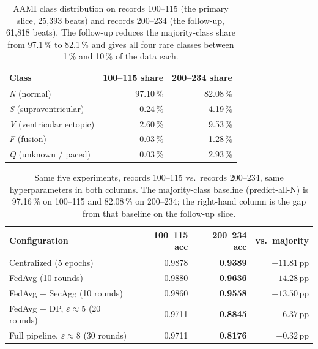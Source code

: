 \documentclass[11pt,a4paper]{report}
\begin{document}
\begin{table}[h]
  \centering
  \caption{AAMI class distribution on records 100--115 (the primary
  slice, 25{,}393 beats) and records 200--234 (the follow-up,
  61{,}818 beats). The follow-up reduces the majority-class share
  from 97.1\,\% to 82.1\,\% and gives all four rare classes between
  1\,\% and 10\,\% of the data each.}
  \label{tab:class-balance-200}
  \begin{tabular}{lrr}
    \toprule
    Class & 100--115 share & 200--234 share \\
    \midrule
    \emph{N} (normal)              & 97.10\,\% & 82.08\,\% \\
    \emph{S} (supraventricular)    &  0.24\,\% &  4.19\,\% \\
    \emph{V} (ventricular ectopic) &  2.60\,\% &  9.53\,\% \\
    \emph{F} (fusion)              &  0.03\,\% &  1.28\,\% \\
    \emph{Q} (unknown / paced)     &  0.03\,\% &  2.93\,\% \\
    \bottomrule
  \end{tabular}
\end{table}

\begin{table}[h]
  \centering
  \caption{Same five experiments, records 100--115 vs.\ records
  200--234, same hyperparameters in both columns. The majority-class
  baseline (predict-all-N) is 97.16\,\% on 100--115 and 82.08\,\% on
  200--234; the right-hand column is the gap from that baseline on
  the follow-up slice.}
  \label{tab:followup-grid}
  \begin{tabular}{lrrr}
    \toprule
    Configuration & 100--115 acc & 200--234 acc & vs.\ majority \\
    \midrule
    Centralized (5 epochs)              & 0.9878 & \textbf{0.9389} & $+11.81$\,pp \\
    FedAvg (10 rounds)                  & 0.9880 & \textbf{0.9636} & $+14.28$\,pp \\
    FedAvg + SecAgg (10 rounds)         & 0.9860 & \textbf{0.9558} & $+13.50$\,pp \\
    FedAvg + DP, $\varepsilon \approx 5$ (20 rounds)
                                        & 0.9711 & \textbf{0.8845} & $+6.37$\,pp \\
    Full pipeline, $\varepsilon \approx 8$ (30 rounds)
                                        & 0.9711 & \textbf{0.8176} & $-0.32$\,pp \\
    \bottomrule
  \end{tabular}
\end{table}
\end{document}
